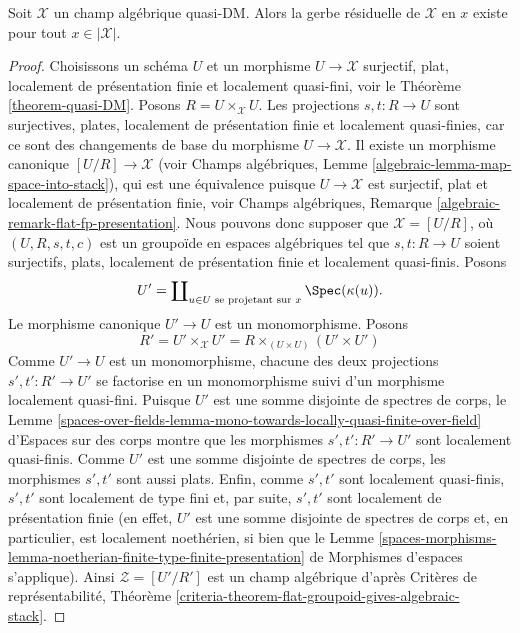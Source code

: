 \begin{lemma}
\label{lemma-every-point-residual-gerbe-quasi-DM}
Soit $\mathcal{X}$ un champ algébrique quasi-DM.
Alors la gerbe résiduelle de $\mathcal{X}$ en $x$ existe pour tout
$x \in |\mathcal{X}|$.
\end{lemma}

\begin{proof}
Choisissons un schéma $U$ et un morphisme $U \to \mathcal{X}$ surjectif,
plat, localement de présentation finie et localement quasi-fini, voir le
Théorème \ref{theorem-quasi-DM}.
Posons $R = U \times_\mathcal{X} U$. Les projections $s, t : R \to U$
sont surjectives, plates, localement de présentation finie et localement
quasi-finies, car ce sont des changements de base du morphisme
$U \to \mathcal{X}$. Il existe un morphisme canonique
$[U/R] \to \mathcal{X}$ (voir Champs algébriques, Lemme
\ref{algebraic-lemma-map-space-into-stack}), qui est une équivalence puisque
$U \to \mathcal{X}$ est surjectif, plat et localement de présentation finie,
voir Champs algébriques, Remarque
\ref{algebraic-remark-flat-fp-presentation}.
Nous pouvons donc supposer que $\mathcal{X} = [U/R]$, où
$(U, R, s, t, c)$ est un groupoïde en espaces algébriques tel que
$s, t : R \to U$ soient surjectifs, plats, localement de présentation finie
et localement quasi-finis. Posons
$$
U' = \coprod\nolimits_{u \in U\text{ se projetant sur }x} \Spec(\kappa(u)).
$$
Le morphisme canonique $U' \to U$ est un monomorphisme. Posons
$$
R' = U' \times_\mathcal{X} U' =
R \times_{(U \times U)} (U' \times U')
$$
Comme $U' \to U$ est un monomorphisme, chacune des deux projections
$s', t' : R' \to U'$ se factorise en un monomorphisme suivi d'un morphisme
localement quasi-fini. Puisque $U'$ est une somme disjointe de spectres
de corps, le Lemme
\ref{spaces-over-fields-lemma-mono-towards-locally-quasi-finite-over-field}
d'Espaces sur des corps montre que les morphismes
$s', t' : R' \to U'$ sont localement quasi-finis. Comme $U'$ est une
somme disjointe de spectres de corps, les morphismes $s', t'$ sont aussi
plats. Enfin, comme $s', t'$ sont localement quasi-finis, $s', t'$ sont
localement de type fini et, par suite, $s', t'$ sont localement de
présentation finie (en effet,
$U'$ est une somme disjointe de spectres de corps et, en particulier,
est localement noethérien, si bien que le Lemme
\ref{spaces-morphisms-lemma-noetherian-finite-type-finite-presentation}
de Morphismes d'espaces s'applique). Ainsi $\mathcal{Z} = [U'/R']$ est un
champ algébrique d'après Critères de représentabilité, Théorème
\ref{criteria-theorem-flat-groupoid-gives-algebraic-stack}.

\end{proof}
